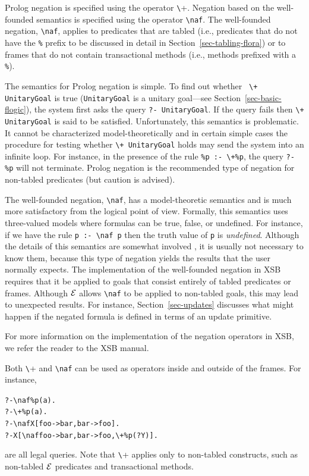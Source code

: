 \documentclass[11pt]{article}
\newcommand{\ERGO}{\mbox{\ensuremath{\cal{E}}\smaller{{\sc{RGO}}}}\xspace}
\newcommand{\FLSYSTEM}{\ERGO}
\newcommand{\bs}{\textbackslash}
\newcommand{\PLGNAF}{\mbox{\texttt{\bs}+}\xspace}
\newcommand{\RULELOGNAF}{{\texttt{{\bs}naf}}\xspace}
\begin{document}
Prolog negation is specified using the operator \PLGNAF.
Negation based on the well-founded semantics is specified using the
operator \RULELOGNAF.  The well-founded negation, \RULELOGNAF, applies to predicates
that are tabled (i.e., predicates that do not have the {\tt \%} prefix
to be discussed in detail in Section~\ref{sec-tabling-flora}) or
to frames that do not contain transactional methods (i.e., methods
prefixed with a {\tt \%}).

The semantics for Prolog negation is simple. To find out whether {\tt
  \PLGNAF UnitaryGoal} is true (\texttt{UnitaryGoal} is a unitary
goal---see Section~\ref{sec-basic-flogic}),
the system first asks the query {\tt ?- UnitaryGoal}. If the query
fails then {\tt \PLGNAF UnitaryGoal} is said to be satisfied. Unfortunately, this
semantics is problematic. It cannot be characterized model-theoretically
and in certain simple cases the procedure for testing whether {\tt \PLGNAF
  UnitaryGoal}
holds may send the system into an infinite loop. For instance, in the
presence of the rule {\tt \%p :- \PLGNAF \%p}, the query {\tt ?- \%p} will not
terminate.  Prolog negation is the recommended type of negation for
non-tabled predicates (but caution is advised).

The well-founded negation, \RULELOGNAF, has a model-theoretic semantics and is
much more
satisfactory from the logical point of view.
Formally, this semantics uses three-valued models where formulas can be
true, false, or undefined. For instance, if we have the rule
{\tt p :- \RULELOGNAF p} then the truth value of {\tt p} is \emph{undefined}.  
Although the details of this
semantics are somewhat involved \cite{gelder-ross-schlipf-91}, it is
usually not necessary to know them, because this type of negation yields
the results that the user normally expects. The implementation of
the well-founded negation in XSB requires that it be applied to goals that
consist entirely of tabled predicates or frames.
Although \FLSYSTEM allows \RULELOGNAF to be applied to non-tabled goals,
this may lead to unexpected results.  For instance, 
Section~\ref{sec-updates} discusses what might happen if the
negated formula is defined in terms of an update primitive.

For more information on the implementation of the negation operators in
XSB, we refer the reader to the XSB manual.

Both \PLGNAF and \RULELOGNAF can be used as operators inside and outside of
the frames. For instance,
\begin{alltt}
       ?- \RULELOGNAF \%p(a).
       ?- \PLGNAF \%p(a).
       ?- \RULELOGNAF X[foo->bar, bar->foo].
       ?- X[\RULELOGNAF foo->bar, bar->foo, \PLGNAF \%p(?Y)].
\end{alltt}
are all legal queries. Note that \PLGNAF applies only to non-tabled
constructs, such as non-tabled \FLSYSTEM predicates and transactional methods.
\end{document}
